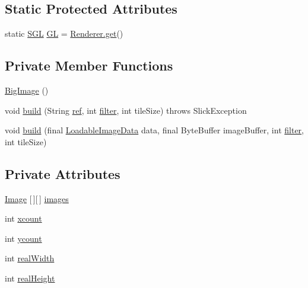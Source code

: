\subsection*{Static Protected Attributes}
\begin{DoxyCompactItemize}
\item 
static \mbox{\hyperlink{interfaceorg_1_1newdawn_1_1slick_1_1opengl_1_1renderer_1_1_s_g_l}{S\+GL}} \mbox{\hyperlink{classorg_1_1newdawn_1_1slick_1_1_big_image_a8b0fd02f9b67f0a874e42e0a701ea7c2}{GL}} = \mbox{\hyperlink{classorg_1_1newdawn_1_1slick_1_1opengl_1_1renderer_1_1_renderer_abe742c3a7dfca67c6c01821d27087308}{Renderer.\+get}}()
\end{DoxyCompactItemize}
\subsection*{Private Member Functions}
\begin{DoxyCompactItemize}
\item 
\mbox{\hyperlink{classorg_1_1newdawn_1_1slick_1_1_big_image_a729b8a17ca390d0ad9fa715269b17009}{Big\+Image}} ()
\item 
void \mbox{\hyperlink{classorg_1_1newdawn_1_1slick_1_1_big_image_a22a00890a41ddf7c996a84b2bc32621b}{build}} (String \mbox{\hyperlink{classorg_1_1newdawn_1_1slick_1_1_image_a32694687591a80299d8b8ad1ea070cee}{ref}}, int \mbox{\hyperlink{classorg_1_1newdawn_1_1slick_1_1_image_a1c6f09687817420f3762f32bb1c3ed76}{filter}}, int tile\+Size)  throws Slick\+Exception 
\item 
void \mbox{\hyperlink{classorg_1_1newdawn_1_1slick_1_1_big_image_a694a2dff36782f956a8d6cc40081482a}{build}} (final \mbox{\hyperlink{interfaceorg_1_1newdawn_1_1slick_1_1opengl_1_1_loadable_image_data}{Loadable\+Image\+Data}} data, final Byte\+Buffer image\+Buffer, int \mbox{\hyperlink{classorg_1_1newdawn_1_1slick_1_1_image_a1c6f09687817420f3762f32bb1c3ed76}{filter}}, int tile\+Size)
\end{DoxyCompactItemize}
\subsection*{Private Attributes}
\begin{DoxyCompactItemize}
\item 
\mbox{\hyperlink{classorg_1_1newdawn_1_1slick_1_1_image}{Image}} \mbox{[}$\,$\mbox{]}\mbox{[}$\,$\mbox{]} \mbox{\hyperlink{classorg_1_1newdawn_1_1slick_1_1_big_image_a297fc524b2aef82e75e23a59c6f4102f}{images}}
\item 
int \mbox{\hyperlink{classorg_1_1newdawn_1_1slick_1_1_big_image_ae42c6b98e3a7924bf005b1b356cca4c2}{xcount}}
\item 
int \mbox{\hyperlink{classorg_1_1newdawn_1_1slick_1_1_big_image_a699c6b87723d356a7062f79c35c6be5a}{ycount}}
\item 
int \mbox{\hyperlink{classorg_1_1newdawn_1_1slick_1_1_big_image_af37ee66244f573122b1b87b4f03e2ac0}{real\+Width}}
\item 
int \mbox{\hyperlink{classorg_1_1newdawn_1_1slick_1_1_big_image_a4a9f1e4248d72ff16ea9e0abe7902685}{real\+Height}}
\end{DoxyCompactItemize}
